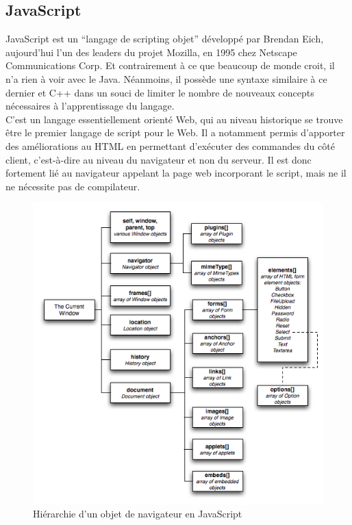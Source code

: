 \documentclass[10pt,a4paper,titlepage]{article}
\begin{document}
\subsection{JavaScript}
JavaScript est un “langage de scripting objet” développé par Brendan Eich, aujourd'hui l'un des leaders du projet Mozilla, en 1995 chez Netscape Communications Corp. Et contrairement à ce que beaucoup de monde croit, il n'a rien à voir avec le Java. Néanmoins, il possède une syntaxe similaire à ce dernier et C++ dans un souci de limiter le nombre de nouveaux concepts nécessaires à l'apprentissage du langage.\\

C'est un langage essentiellement orienté Web, qui au niveau historique se trouve être le premier langage de script pour le Web. Il a notamment permis d'apporter des améliorations au HTML en permettant d'exécuter des commandes du côté client, c'est-à-dire au niveau du navigateur et non du serveur. Il est donc fortement lié au navigateur appelant la page web incorporant le script, mais ne il ne nécessite pas de compilateur.\\

\begin{figure}[h]
	\begin{center}
			\includegraphics[width=12cm]{img/schema_js.png}
			\caption{Hiérarchie d'un objet de navigateur en JavaScript}
			\label{schema}
	\end{center}
\end{figure}
\end{document}
